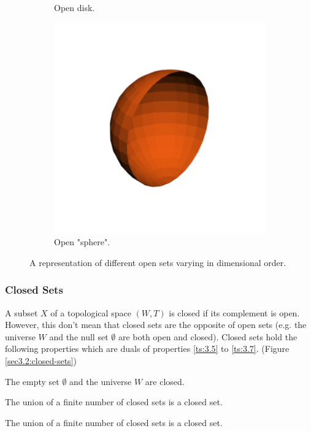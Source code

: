 \documentclass[a4paper,11pt,oneside]{article}
\begin{document}
\begin{figure}[ht]
\begin{subfigure}[b]{0.2\textwidth}
         \caption{Open disk.}
     \end{subfigure}
     \hfill
     \begin{subfigure}[b]{0.2\textwidth}
         \centering
         \includegraphics[width=\textwidth]{section3/3.2/open-sphere.png}
         \caption{Open "sphere".}
     \end{subfigure}
     \hfill
        \caption{A representation of different open sets varying in dimensional order.}
        \label{sec3.2:open-sets}
\end{figure}

   
    
\subsubsection{Closed Sets}
\begin{definition}
	A subset $X$ of a topological space $(W, T)$ is closed if its complement is open. However, this don't mean that closed sets are the opposite of open sets (e.g. the universe $W$ and the null set $\emptyset$ are both open and closed). Closed sets hold the following properties which are duals of properties \eqref{ts:3.5} to \eqref{ts:3.7}. (Figure \ref{sec3.2:closed-sets})
		    
	\begin{property}
		The empty set $\emptyset$ and the universe $W$ are closed. \cite{mansfield_1987}
	\end{property}
	\begin{property}
		The union of a finite number of closed sets is a closed set. \cite{mansfield_1987}
	\end{property}
	\begin{property}
		The union of a finite number of closed sets is a closed set. \cite{mansfield_1987}
	\end{property}
\end{definition}
    
\end{document}
